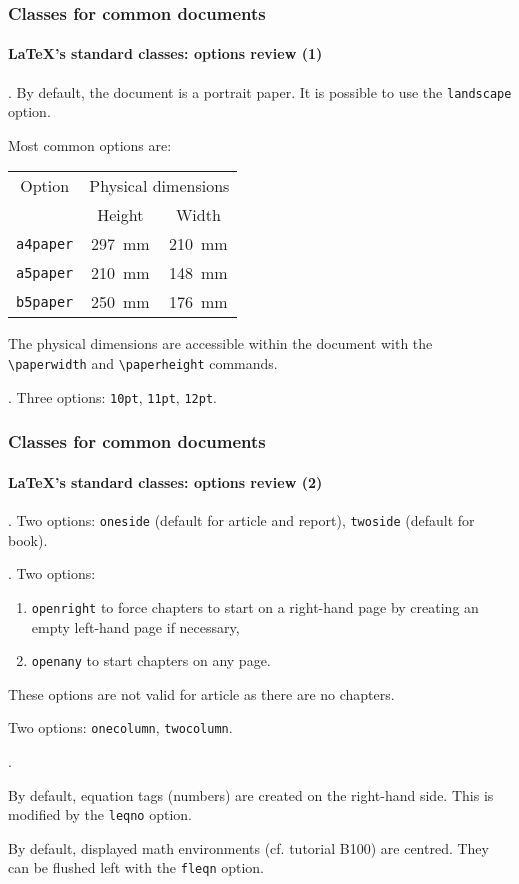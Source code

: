 \documentclass[11pt]{beamer}
\begin{document}
\begin{frame}[fragile]
	\frametitle{Classes for common documents}
	\framesubtitle{\LaTeX{}'s standard classes: options review (1)}
	
	
	.
	By default, the document is a portrait paper. 
	It is possible to use the \texttt{landscape} option.
	
	Most common options are:
	\begin{table}[h]
		\begin{tabular}{*{3}{c}}
			\toprule
			     Option      & \multicolumn{2}{c}{Physical dimensions} \\
			 \cmidrule{2-3}  &    Height     &          Width          \\ \midrule
			\texttt{a4paper} & \SI{297}{\mm} &      \SI{210}{\mm}      \\
			\texttt{a5paper} & \SI{210}{\mm} &      \SI{148}{\mm}      \\
			\texttt{b5paper} & \SI{250}{\mm} &      \SI{176}{\mm}      \\ \bottomrule
		\end{tabular}
	\end{table}

	The physical dimensions are accessible within the document with the \verb|\paperwidth| and \verb|\paperheight| commands.
	
	
	\vspace*{1ex}
	
	
	.
	Three options: \texttt{10pt}, \texttt{11pt}, \texttt{12pt}.
\end{frame}

\begin{frame}
	\frametitle{Classes for common documents}
	\framesubtitle{\LaTeX{}'s standard classes: options review (2)}
	
	
	.
	Two options: \texttt{oneside} (default for article and report), \texttt{twoside} (default for book).
	
	
	.
	Two options:
	\begin{enumerate}
		\item \texttt{openright} to force chapters to start on a right-hand page by creating an empty left-hand page if necessary,
		\item \texttt{openany} to start chapters on any page.
	\end{enumerate}
	These options are not valid for article as there are no chapters.
	
	
	\vspace*{1ex}
	
	
	Two options: \texttt{onecolumn}, \texttt{twocolumn}.
	
	
	\vspace*{1ex}
	
	
	.
	
	By default, equation tags (numbers) are created on the right-hand side.
	This is modified by the \texttt{leqno} option.
	
	By default, displayed math environments (cf. tutorial B100) are centred.
	They can be flushed left with the \texttt{fleqn} option.
\end{frame}
\end{document}
